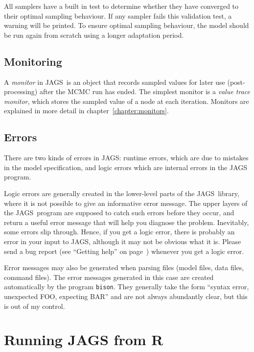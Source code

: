 \documentclass[11pt, a4paper, titlepage]{report}
\newcommand{\JAGS}{\textsf{JAGS}}
\newcommand{\R}{\textsf{R}}
\begin{document}
All samplers have a built in test to determine whether they have
converged to their optimal sampling behaviour.  If any sampler fails
this validation test, a warning will be printed. To ensure optimal
sampling behaviour, the model should be run again from scratch using a
longer adaptation period.

\section{Monitoring}
\label{section:monitoring}

A {\em monitor} in \JAGS\ is an object that records sampled values for
later use (post-processing) after the MCMC run has ended. The simplest
monitor is a {\em value trace monitor}, which stores the sampled value
of a node at each iteration. Monitors are explained in more detail in
chapter~\ref{chapter:monitors}.

\section{Errors}

There are two kinds of errors in \JAGS: runtime errors, which are due to
mistakes in the model specification, and logic errors which are internal
errors in the JAGS program. 

Logic errors are generally created in the lower-level parts of the
\JAGS\ library, where it is not possible to give an informative error
message.  The upper layers of the \JAGS\ program are supposed to catch
such errors before they occur, and return a useful error message that
will help you diagnose the problem.  Inevitably, some errors slip
through. Hence, if you get a logic error, there is probably an error
in your input to \JAGS, although it may not be obvious what it
is. Please send a bug report (see ``Getting help'' on
page~\pageref{section:help}) whenever you get a logic error.

Error messages may also be generated when parsing files (model files,
data files, command files).  The error messages generated in this case
are created automatically by the program \texttt{bison}. They
generally take the form ``syntax error, unexpected FOO, expecting BAR''
and are not always abundantly clear, but this is out of my control.

\chapter{Running JAGS from \R}
\label{chapter:R} 
\end{document}

